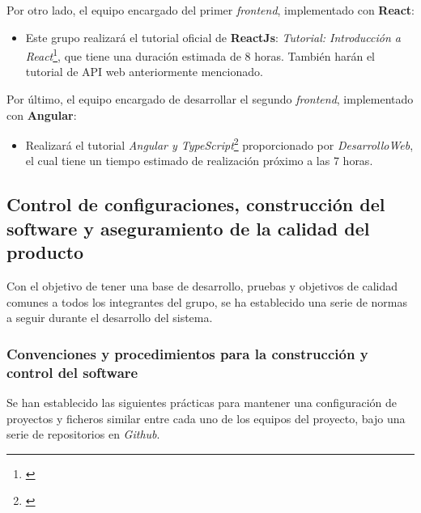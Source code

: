 \documentclass[11pt, a4paper, titlepage]{article}
\begin{document}
Por otro lado, el equipo encargado del primer \textit{frontend}, implementado con \textbf{React}:

\begin{itemize}

\item  Este grupo realizará el tutorial oficial de \textbf{ReactJs}: \textit{Tutorial: Introducción a React}\footnote{\href{https://es.reactjs.org/tutorial/tutorial.html}{\color{blue}{Tutorial: Introducción a React}}}, que tiene una duración estimada de 8 horas. También harán el tutorial de API web anteriormente mencionado.

\end{itemize}

Por último, el equipo encargado de desarrollar el segundo \textit{frontend}, implementado con \textbf{Angular}:

\begin{itemize}

\item Realizará el tutorial \textit{Angular y TypeScript}\footnote{\href{https://angular.io/tutorial}{\color{blue}{Tutorial: Angular y TypeScript}}} proporcionado por \textit{DesarrolloWeb}, el cual tiene un tiempo estimado de realización próximo a las 7 horas.

\end{itemize}


\subsection{Control de configuraciones, construcción del software y aseguramiento de la calidad del producto}

Con el objetivo de tener una base de desarrollo, pruebas y objetivos de calidad comunes a todos los integrantes del grupo, se ha establecido una serie de normas a seguir durante el desarrollo del sistema.



\subsubsection{Convenciones y procedimientos para la construcción y control del software}

Se han establecido las siguientes prácticas para mantener una configuración de proyectos y ficheros similar entre cada uno de los equipos del proyecto, bajo una serie de repositorios en \textit{Github}.
\end{document}
